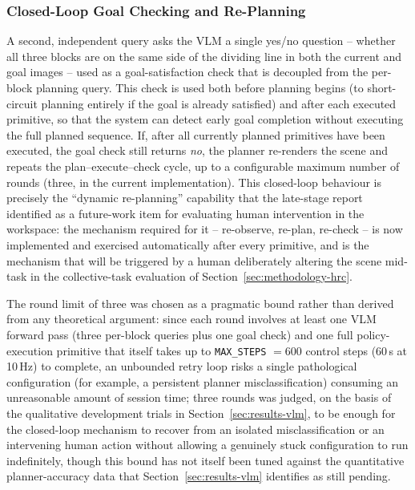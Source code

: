 \documentclass[12pt]{article}
\begin{document}
\subsubsection{Closed-Loop Goal Checking and Re-Planning}
A second, independent query asks the VLM a single yes/no question -- whether all three blocks are on the same side of the dividing line in both the current and goal images -- used as a goal-satisfaction check that is decoupled from the per-block planning query. This check is used both before planning begins (to short-circuit planning entirely if the goal is already satisfied) and after each executed primitive, so that the system can detect early goal completion without executing the full planned sequence. If, after all currently planned primitives have been executed, the goal check still returns \emph{no}, the planner re-renders the scene and repeats the plan--execute--check cycle, up to a configurable maximum number of rounds (three, in the current implementation). This closed-loop behaviour is precisely the ``dynamic re-planning'' capability that the late-stage report identified as a future-work item for evaluating human intervention in the workspace: the mechanism required for it -- re-observe, re-plan, re-check -- is now implemented and exercised automatically after every primitive, and is the mechanism that will be triggered by a human deliberately altering the scene mid-task in the collective-task evaluation of Section~\ref{sec:methodology-hrc}.

The round limit of three was chosen as a pragmatic bound rather than derived from any theoretical argument: since each round involves at least one VLM forward pass (three per-block queries plus one goal check) and one full policy-execution primitive that itself takes up to \texttt{MAX\_STEPS} $= 600$ control steps (60\,s at 10\,Hz) to complete, an unbounded retry loop risks a single pathological configuration (for example, a persistent planner misclassification) consuming an unreasonable amount of session time; three rounds was judged, on the basis of the qualitative development trials in Section~\ref{sec:results-vlm}, to be enough for the closed-loop mechanism to recover from an isolated misclassification or an intervening human action without allowing a genuinely stuck configuration to run indefinitely, though this bound has not itself been tuned against the quantitative planner-accuracy data that Section~\ref{sec:results-vlm} identifies as still pending.
\end{document}
